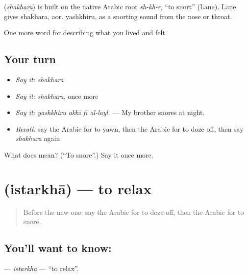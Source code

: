 \begin{cousinweb}
\textbf{} (\emph{shakhara}) is built on the native Arabic root \emph{sh-kh-r}, \textquotedblleft{}to snort\textquotedblright{} (Lane). Lane gives shakhara, aor. yashkhiru, as a snorting sound from the nose or throat.
\end{cousinweb}

\begin{grammarlens}[title={What you've built}]
One more word for describing what you lived and felt.
\end{grammarlens}

\subsection*{Your turn}
\begin{itemize}
\raggedright
  \item \emph{Say it:} \emph{shakhara}
  \item \emph{Say it:} \emph{shakhara}, once more
  \item \emph{Say it:} \emph{yashkhiru akhī fī al-layl.} — My brother snores at night.
  \item \emph{Recall:} say the Arabic for to yawn, then the Arabic for to doze off, then say \emph{shakhara} again
\end{itemize}

\begin{tcolorbox}[breakable,colback=teal!4,colframe=teal!35!black,title={Before you move on}]
What does  mean? (\textquotedblleft{}To snore\textquotedblright{}.) Say it once more.
\end{tcolorbox}
\section[\texorpdfstring{\ar{استرخى} (istarkhā)}{استرخى (istarkhā)}]{ (istarkhā) — to relax}

\label{lesson:AR-C515-istarkha}



\begin{quote}
Before the new one: say the Arabic for to doze off, then the Arabic for to snore.
\end{quote}

\subsection*{You'll want to know: }
\textbf{} — \emph{istarkhā} — \textquotedblleft{}to relax\textquotedblright{}.


